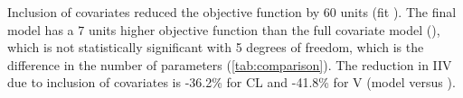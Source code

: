 
Inclusion of covariates reduced the objective function by 60 units (fit ). The final model  has a 7 units higher objective function than the full covariate model (), which is not statistically significant with 5 degrees of freedom, which is the difference in the number of parameters (\cref{tab:comparison}). The reduction in \gls{IIV} due to inclusion of covariates is -36.2\% for \gls{CL} and -41.8\% for \gls{V} (model  versus ). 

      
